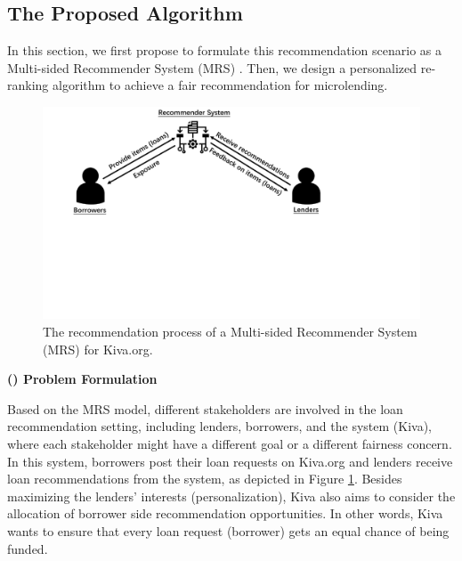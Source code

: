 \subsection{The Proposed Algorithm}
\label{subsec:far_algorithm}
In this section, we first propose to formulate this recommendation scenario as a Multi-sided Recommender System (MRS) \cite{burke2017multisided, burke2017patterns}. Then, we design a personalized re-ranking algorithm to achieve a fair recommendation for microlending.

\begin{figure}[t]
\includegraphics[width=0.99\columnwidth]{imgs/far/mrs.pdf}
\caption{The recommendation process of a Multi-sided Recommender System (MRS) for Kiva.org.}
\label{fig:mrs}
\end{figure}

\vspace{0.25cm}
\noindent \textbf{() Problem Formulation}
\vspace{0.25cm}

Based on the MRS model, different stakeholders are involved in the loan recommendation setting, including lenders, borrowers, and the system (Kiva), where each stakeholder might have a different goal or a different fairness concern. In this system, borrowers post their loan requests on Kiva.org and lenders receive loan recommendations from the system, as depicted in Figure \ref{fig:mrs}. 
Besides maximizing the lenders' interests (personalization), Kiva also aims to consider the allocation of borrower side recommendation opportunities. In other words, Kiva wants to ensure that every loan request (borrower) gets an equal chance of being funded.


